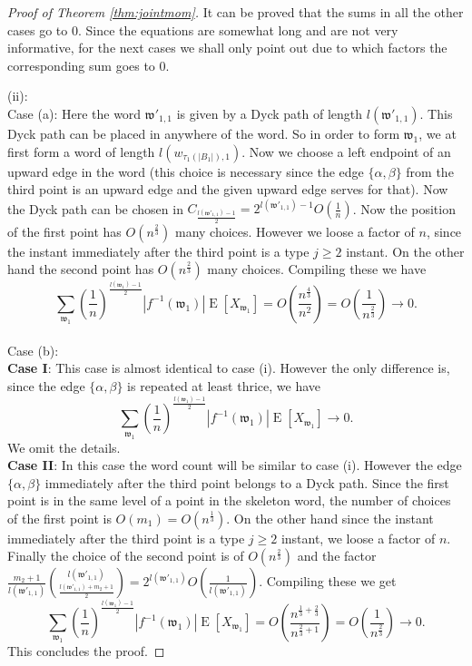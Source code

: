 \documentclass[12pt]{article}
\numberwithin{equation}{section}
\numberwithin{equation}{section}
\theoremstyle{definition}
\DeclareMathOperator{\E}{E} \DeclareMathOperator{\var}{Var}
\renewcommand{\1}{\bf 1}
\begin{document}
\begin{proof}[Proof of Theorem \ref{thm:jointmom}]
It can be proved that the sums in all the other cases go to $0$.
Since the equations are somewhat long and are not very informative, for the next cases we shall only point out due to which factors the corresponding sum goes to $0$.  

\noindent 
(ii):
\\
Case (a): Here the word $\mathfrak{w}'_{1,1}$ is given by a Dyck path of length $l(\mathfrak{w}'_{1,1})$. This Dyck path can be placed in anywhere of the word. So in order to form $\mathfrak{w}_{1}$, we at first form a word of length $l(w_{\tau_{1}(|B_{1}|),1})$. Now we choose a left endpoint of an upward edge in the word (this choice is necessary since the edge $\{ \alpha,\beta \}$ from the third point is an upward edge and the given upward edge serves for that). Now the Dyck path can be chosen in $C_{\frac{l(\mathfrak{w}'_{1,1})-1}{2}}= 2^{l(\mathfrak{w}'_{1,1})-1}O\left( \frac{1}{n} \right)$. Now the position of the first point has $O\left(n^{\frac{2}{3}}\right)$ many choices. However we loose a factor of $n$, since the instant immediately after the third point is a type $j \ge 2$ instant. On the other hand the second point has $O\left( n^{\frac{2}{3}} \right)$ many choices. Compiling these we have $$\sum_{\mathfrak{w}_{1}} \left( \frac{1}{n} \right)^{\frac{l(\mathfrak{w}_{1})-1}{2}}\left| f^{-1}(\mathfrak{w}_{1}) \right|  \E[X_{\mathfrak{w}_{1}}]=O\left( \frac{n^{\frac{4}{3}}}{n^{2}} \right)=O\left( \frac{1}{n^{\frac{2}{3}}} \right)\to 0.$$
\\
Case (b):\\
\textbf{Case I}: This case is almost identical to case (i). However the only difference is, since the edge $\{ \alpha, \beta \}$ is repeated at least thrice, we have 
\[
\sum_{\mathfrak{w}_{1}} \left( \frac{1}{n} \right)^{\frac{l(\mathfrak{w}_{1})-1}{2}}\left| f^{-1}(\mathfrak{w}_{1}) \right|  \E[X_{\mathfrak{w}_{1}}] \to 0.
\]
We omit the details.\\
\textbf{Case II}: In this case the word count will be similar to case (i). However the edge $\{ \alpha,\beta \}$ immediately after the third point belongs to a Dyck path. Since the first point is in the same level of a point in the skeleton word, the number of choices of the first point is $O(m_{1})=O(n^{\frac{1}{3}})$. On the other hand since the instant immediately after the third point is a type $j \ge 2$ instant, we loose a factor of $n$. Finally the choice of the second point is of $O\left(n^{\frac{2}{3}}\right)$ and the factor $\frac{m_{2}+1}{l(\mathfrak{w}'_{1,1})}\binom{l(\mathfrak{w}'_{1,1})}{\frac{l(\mathfrak{w}'_{1,1})+m_{2}+1}{2}}= 2^{l(\mathfrak{w}'_{1,1})}O\left(\frac{1}{l(\mathfrak{w}'_{1,1})}\right)$. Compiling these we get
\begin{equation*}
\sum_{\mathfrak{w}_{1}} \left( \frac{1}{n} \right)^{\frac{l(\mathfrak{w}_{1})-1}{2}}\left| f^{-1}(\mathfrak{w}_{1}) \right|  \E[X_{\mathfrak{w}_{1}}] = O\left( \frac{n^{\frac{1}{3}+ \frac{2}{3}}}{n^{\frac{2}{3}+1}}\right)=O\left( \frac{1}{n^{\frac{2}{3}}} \right) \to 0.
\end{equation*}
This concludes the proof.
\end{proof}
\end{document}
